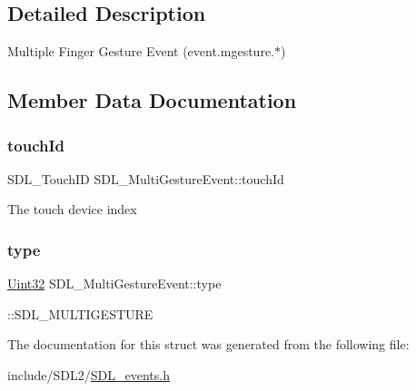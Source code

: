 \subsection{Detailed Description}
Multiple Finger Gesture Event (event.\+mgesture.$\ast$) 

\subsection{Member Data Documentation}
\mbox{\label{struct_s_d_l___multi_gesture_event_aa15d1201559a3c9277082af71a972dc1}} 
\subsubsection{\texorpdfstring{touch\+Id}{touchId}}
{\footnotesize\ttfamily S\+D\+L\+\_\+\+Touch\+ID S\+D\+L\+\_\+\+Multi\+Gesture\+Event\+::touch\+Id}

The touch device index \mbox{\label{struct_s_d_l___multi_gesture_event_ab0c7adc9a3f71cc3532bfe0ff8cc6120}} 
\subsubsection{\texorpdfstring{type}{type}}
{\footnotesize\ttfamily \hyperlink{_s_d_l__stdinc_8h_add440eff171ea5f55cb00c4a9ab8672d}{Uint32} S\+D\+L\+\_\+\+Multi\+Gesture\+Event\+::type}

\+::\+S\+D\+L\+\_\+\+M\+U\+L\+T\+I\+G\+E\+S\+T\+U\+RE 

The documentation for this struct was generated from the following file\+:\begin{DoxyCompactItemize}
\item 
include/\+S\+D\+L2/\hyperlink{_s_d_l__events_8h}{S\+D\+L\+\_\+events.\+h}\end{DoxyCompactItemize}
